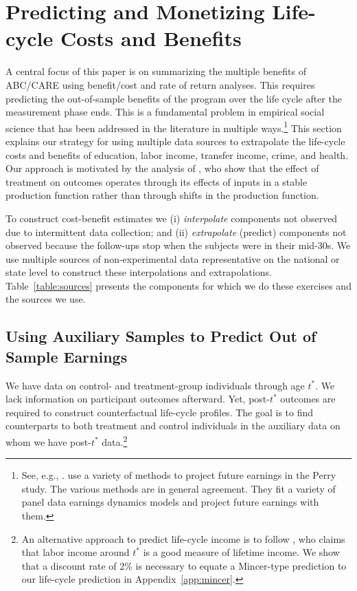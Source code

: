 \section{Predicting and Monetizing Life-cycle Costs and Benefits}\label{section:cbamethodology}

A central focus of this paper is on summarizing the multiple benefits of ABC/CARE using benefit/cost and rate of return analyses. This requires predicting the out-of-sample benefits of the program over the life cycle after the measurement phase ends. This is a fundamental problem in empirical social science that has been addressed in the literature in multiple ways.\footnote{See, e.g., \cite{Heckman_Lochner_ea_2006_HEE}. \citet{Heckman_Moon_etal_2010_RateofReturn} use a variety of methods to project future earnings in the Perry study. The various methods are in general agreement. They fit a variety of panel data earnings dynamics models and project future earnings with them.} This section explains our strategy for using multiple data sources to extrapolate the life-cycle costs and benefits of education, labor income, transfer income, crime, and health. Our approach is motivated by the analysis of \citet{Heckman_Pinto_etal_2013_PerryFactor}, who show that the effect of treatment on outcomes operates through its effects of inputs in a stable production function rather than through shifts in the production function.

To construct cost-benefit estimates we (i) \textit{interpolate} components not observed due to intermittent data collection; and (ii) \textit{extrapolate} (predict) components not observed because the follow-ups stop when the subjects were in their mid-30s. We use multiple sources of non-experimental data representative on the national or state level to construct these interpolations and extrapolations. Table~\ref{table:sources} presents the components for which we do these exercises and the sources we use.

\subsection{Using Auxiliary Samples to Predict Out of Sample Earnings}\label{sec:necrosis}

We have data on control- and treatment-group individuals through age $t^{\ast}$. We lack information on participant outcomes afterward. Yet, post-$t^{\ast}$ outcomes are required to construct counterfactual life-cycle profiles. The goal is to find counterparts to both treatment and control individuals in the auxiliary data on whom we have post-$t^{\ast}$ data.\footnote{An alternative approach to predict life-cycle income is to follow \citet{Mincer_1974_schooling}, who claims that labor income around $t^*$ is a good measure of lifetime income. We show that a discount rate of 2\% is necessary to equate a Mincer-type prediction to our life-cycle prediction in Appendix~\ref{app:mincer}.}

